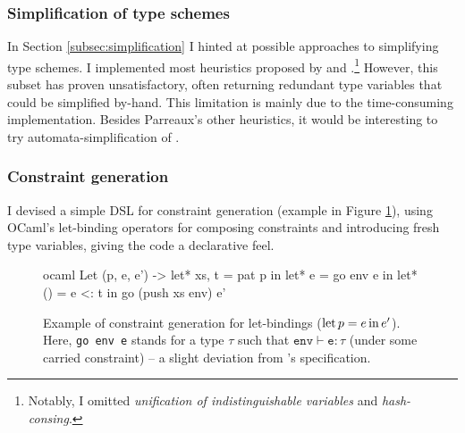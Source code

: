 \subsubsection{Simplification of type schemes} In Section \ref{subsec:simplification} I hinted at possible approaches to simplifying type schemes. I implemented most heuristics proposed by \textcite{simple-sub} and \textcite{mlstruct}.\footnote{Notably, I omitted \emph{unification of indistinguishable variables} and \emph{hash-consing}.} 
However, this subset has proven unsatisfactory, often returning redundant type variables that could be simplified by-hand. This limitation is mainly due to the time-consuming implementation. 
Besides Parreaux's other heuristics, it would be interesting to try automata-simplification of \textcite[Chapter~7]{dolan-thesis}.

\subsubsection{Constraint generation} I devised a simple DSL for constraint generation (example in Figure \ref{fig:cstr-gen}), using OCaml's let-binding operators for composing constraints and introducing fresh type variables, giving the code a declarative feel. 

\begin{figure}
    \centering
\begin{cminted}{ocaml}
Let (p, e, e') ->
  let* xs, t = pat p in
  let* e = go env e in
  let* () = e <: t in
  go (push xs env) e'
\end{cminted}
    \caption{Example of constraint generation for \fabric{} let-bindings ($\mathrm{let}\,{p}={e}\,\mathrm{in}\, e'$). Here, \texttt{go env e} stands for a type $\tau$ such that $\texttt{env} \vdash \texttt{e} : \tau$ (under some carried constraint) -- a slight deviation from \inference{}'s specification.}
    \label{fig:cstr-gen}
\end{figure}

